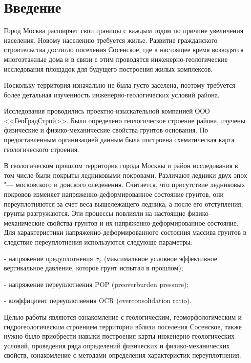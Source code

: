 \chapter*{Введение}                         %

Город Москва расширяет свои границы с каждым годом по причине увеличения населения. 
Новому населению требуется жилье. Развитие гражданского строительства достигло поселения 
Сосенское, где в настоящее время возводятся многоэтажные дома и в связи с этим проводятся 
инженерно-геологические исследования площадок для будущего построения жилых комплексов.

Поскольку территория изначально не была густо заселена, поэтому требуется более детальная 
изученность инженерно-геологических условий района.

Исследования проводились проектно-изыскательной компанией ООО <<ГеоГрадСтрой>>. 
Было определено геологическое строение района, изучены физические и физико-механические свойства грунтов основания. 
По предоставленным организацией данным была построена схематическая карта геологического строения.

В геологическом прошлом территория города Москвы и район исследования в том числе были 
покрыты ледниковыми покровами. Различают ледники двух эпох "--- московского и донского оледенения. 
Считается, что присутствие ледниковых покровов изменяет напряженно-деформированное состояние 
грунтов, они переуплотняются за счет веса вышележащего ледника, а после его отступления, 
грунты разгружаются. Эти процессы повлияли на настоящие физико-механические свойства грунтов 
и их напряженно-деформированное состояние. Для характеристики напряженно-деформированного 
состояния массива грунтов в следствие переуплотнения используются следующе параметры:

- напряжение предуплотнения $\sigma_c$ (максимальное условное эффективное вертикальное давление, 
которое грунт испытал в прошлом);

- напряжение переуплотнения POP (preoverburden pressure);

- коэффициент переуплотнения OCR (overconsolidation ratio).

Целью работы являются ознакомление с геологическим, геоморфологическим и 
гидрогеологическим строением территории вблизи поселения Сосенское, также 
нужно было приобрести навыки построения карты инженерно-геологических 
условий, проведения ряда определений физических и физико-механических 
свойств, ознакомление с методами определения характеристик переуплотнения.

